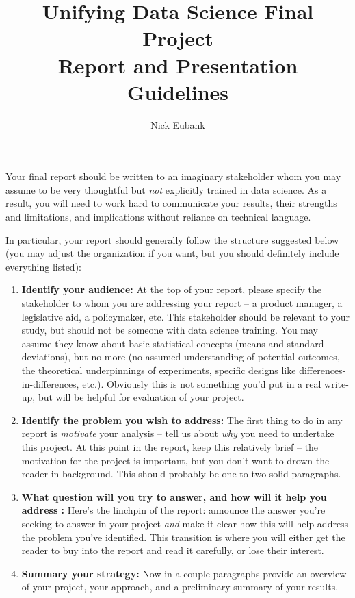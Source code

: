 \documentclass[12pt]{article}
\title{Unifying Data Science Final Project \\ Report and Presentation Guidelines}
\author{Nick Eubank}
\begin{document}
\maketitle

Your final report should be written to an imaginary stakeholder whom you may assume to be very thoughtful but \emph{not} explicitly trained in data science. As a result, you will need to work hard to communicate your results, their strengths and limitations, and implications without reliance on technical language. 

In particular, your report should generally follow the structure suggested below (you may adjust the organization if you want, but you should definitely include everything listed): 

\begin{enumerate}
    \item \textbf{Identify your audience:}  At the top of your report, please specify the stakeholder to whom you are addressing your report -- a product manager, a legislative aid, a policymaker, etc. This stakeholder should be relevant to your study, but should not be someone with data science training. You may assume they know about basic statistical concepts (means and standard deviations), but no more (no assumed understanding of potential outcomes, the theoretical underpinnings of experiments, specific designs like differences-in-differences, etc.). Obviously this is not something you'd put in a real write-up, but will be helpful for evaluation of your project. 
    \item \textbf{Identify the problem you wish to address:} The first thing to do in any report is \emph{motivate} your analysis -- tell us about \emph{why} you need to undertake this project. At this point in the report, keep this relatively brief -- the motivation for the project is important, but you don't want to drown the reader in background. This should probably be one-to-two solid paragraphs.  
    \item \textbf{What question will you try to answer, and how will it help you address :} Here's the linchpin of the report: announce the answer you're seeking to answer in your project \emph{and} make it clear how this will help address the problem you've identified. This transition is where you will either get the reader to buy into the report and read it carefully, or lose their interest. 
    \item \textbf{Summary your strategy:} Now in a couple paragraphs provide an overview of your project, your approach, and a preliminary summary of your results. 
\end{enumerate}
\end{document}
